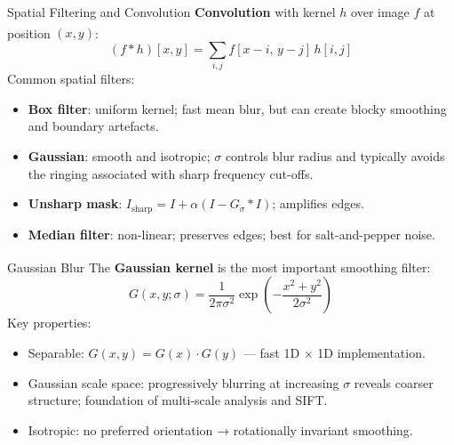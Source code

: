 \begin{v3topic}{Spatial Filtering and Convolution}
    \textbf{Convolution} with kernel $h$ over image $f$ at position $(x,y)$\textsuperscript{\cite[][pp.~120--132]{gonzalezWoods2018}}:
    \begin{equation}
        (f * h)[x,y] = \sum_{i,j} f[x-i,\, y-j]\, h[i,j]
    \end{equation}
    Common spatial filters:
    \begin{itemize}
        \item \textbf{Box filter}: uniform kernel; fast mean blur, but can create blocky smoothing and boundary artefacts.
        \item \textbf{Gaussian}: smooth and isotropic; $\sigma$ controls blur radius and typically avoids the ringing associated with sharp frequency cut-offs.
        \item \textbf{Unsharp mask}: $I_{\text{sharp}} = I + \alpha(I - G_\sigma * I)$; amplifies edges.
        \item \textbf{Median filter}: non-linear; preserves edges; best for salt-and-pepper noise.
    \end{itemize}

\end{v3topic}
\begin{v3topic}{Gaussian Blur}
    The \textbf{Gaussian kernel} is the most important smoothing filter\textsuperscript{\cite[][pp.~138--142]{jahneDigitalImageProcessing2005}}:
    \begin{equation}
        G(x,y;\sigma) = \frac{1}{2\pi\sigma^2} \exp\!\left(-\frac{x^2+y^2}{2\sigma^2}\right)
    \end{equation}
    Key properties:
    \begin{itemize}
        \item Separable: $G(x,y) = G(x)\cdot G(y)$ — fast 1D × 1D implementation.
        \item Gaussian scale space: progressively blurring at increasing $\sigma$ reveals coarser structure; foundation of multi-scale analysis and SIFT.
        \item Isotropic: no preferred orientation → rotationally invariant smoothing.
    \end{itemize}

\end{v3topic}
